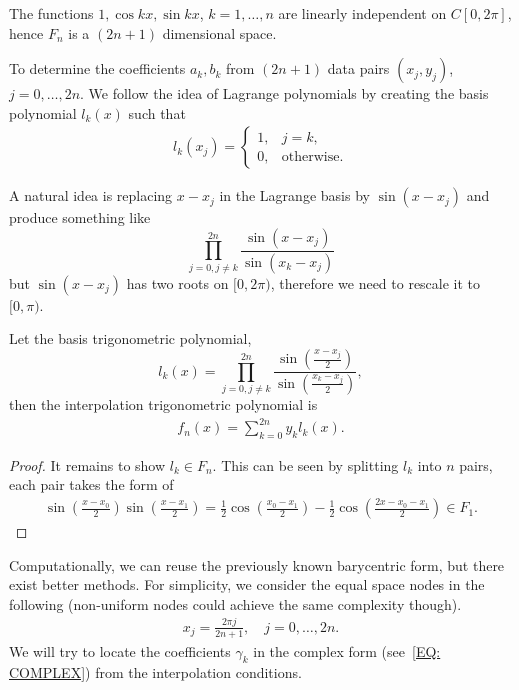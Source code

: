 \begin{corollary}
\label{Cor: 2-Fou-bas-ind}
    The functions $1, \cos kx, \sin kx$, $k=1,\dots, n$ are linearly independent on $C [0, 2\pi]$, hence $F_n$ is a $(2n+1)$ dimensional space.
\end{corollary}
To determine the coefficients $a_k, b_k$ from $(2n+1)$ data pairs $(x_j, y_j)$, $j=0, \dots, 2n$. We follow the idea of Lagrange polynomials by creating the basis polynomial $l_k(x)$ such that
\begin{eqnarray}
    l_k(x_j) = \begin{cases}
        1, &j = k,\\
        0,&\text{otherwise}.
    \end{cases} 
\end{eqnarray}
\begin{remark}
    A natural idea is replacing $x - x_j$ in the Lagrange basis by $\sin(x - x_j)$ and produce something like 
$$\prod_{j=0, j\neq k}^{2n}\frac{\sin(x - x_j)}{\sin(x_k - x_j)}$$
but $\sin(x - x_j)$ has two roots on $[0, 2\pi)$, therefore we need to rescale it to $[0, \pi)$.
\end{remark}
\begin{theorem}
\label{Thm: 2-Tri-Lag}
    Let the basis trigonometric polynomial, 
    $$l_k(x) =\prod_{j=0, j\neq k}^{2n}\frac{\sin(\frac{x - x_j}{2})}{\sin(\frac{x_k - x_j}{2})} ,$$
    then the interpolation trigonometric polynomial is 
    \begin{eqnarray}
        f_n(x) = \sum_{k=0}^{2n} y_k l_k(x).
    \end{eqnarray}
\end{theorem}
\begin{proof}
    It remains to show $l_k\in F_n$. This can be seen by splitting $l_k$ into $n$ pairs, each pair takes the form of 
    \begin{eqnarray}
        \sin(\frac{x-x_0}{2})\sin(\frac{x-x_1}{2}) = \frac{1}{2}\cos\left( \frac{x_0 - x_1}{2}\right) - \frac{1}{2}\cos\left(\frac{2x - x_0 - x_1}{2}\right)\in F_1.
    \end{eqnarray}
\end{proof}
Computationally, we can reuse the previously known barycentric form, but there exist better methods. For simplicity, we consider the equal space nodes in the following (non-uniform nodes could achieve the same complexity though). 
\begin{eqnarray}
    x_j = \frac{2\pi j}{2n + 1}, \quad j = 0, \dots, 2n. 
\end{eqnarray}
We will try to locate the coefficients $\gamma_k$ in the complex form (see~\eqref{EQ: COMPLEX}) from the interpolation conditions.
